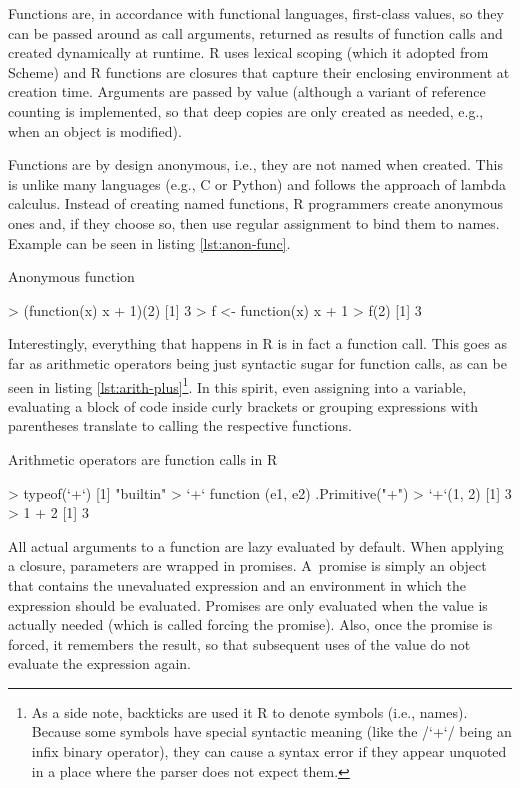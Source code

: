 Functions are, in accordance with functional languages, first-class values, so they can be passed around as call arguments, returned as results of function calls and created dynamically at runtime. R uses lexical scoping (which it adopted from Scheme) and R functions are closures that capture their enclosing environment at creation time. Arguments are passed by value (although a variant of reference counting is implemented, so that deep copies are only created as needed, e.g., when an object is modified).

Functions are by design anonymous, i.e., they are not named when created. This is unlike many languages (e.g., C or Python) and follows the approach of lambda calculus. Instead of creating named functions, R programmers create anonymous ones and, if they choose so, then use regular assignment to bind them to names. Example can be seen in listing \ref{lst:anon-func}.

\begin{listing}[htbp]
  \caption{\label{lst:anon-func}Anonymous function}
  \begin{rcode}
> (function(x) x + 1)(2)
[1] 3
> f <- function(x) x + 1
> f(2)
[1] 3
  \end{rcode}
\end{listing}

Interestingly, everything that happens in R is in fact a function call. This goes as far as arithmetic operators being just syntactic sugar for function calls, as can be seen in listing \ref{lst:arith-plus}\footnote{As a side note, backticks are used it R to denote symbols (i.e., names). Because some symbols have special syntactic meaning (like the \rinline/`+`/ being an infix binary operator), they can cause a syntax error if they appear unquoted in a place where the parser does not expect them.}. In this spirit, even assigning into a variable, evaluating a block of code inside curly brackets or grouping expressions with parentheses translate to calling the respective functions.

\begin{listing}[htbp]
  \caption{\label{lst:arith-plus}Arithmetic operators are function calls in R}
  \begin{rcode}
> typeof(`+`)
[1] "builtin"
> `+`
function (e1, e2)  .Primitive("+")
> `+`(1, 2)
[1] 3
> 1 + 2
[1] 3
  \end{rcode}
\end{listing}

All actual arguments to a function are lazy evaluated by default. When applying a closure, parameters are wrapped in promises. A~promise is simply an object that contains the unevaluated expression and an environment in which the expression should be evaluated. Promises are only evaluated when the value is actually needed (which is called forcing the promise). Also, once the promise is forced, it remembers the result, so that subsequent uses of the value do not evaluate the expression again.

